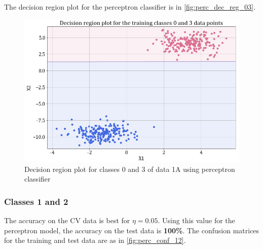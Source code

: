 \documentclass[11pt,a4paper]{article}
\begin{document}
The decision region plot for the perceptron classifier is in \autoref{fig:perc_dec_reg_03}.
\begin{figure}[H]
    \centering
    \includegraphics[scale=0.45]{images/1A_perceptron_training_classes_0_and_3_dec_reg.png}
    \caption{Decision region plot for classes 0 and 3 of data 1A using perceptron classifier}
    \label{fig:perc_dec_reg_03}
\end{figure}

\subsubsection{Classes 1 and 2}


The accuracy on the CV data is best for $\eta = 0.05$. Using this value for the perceptron model, the accuracy on the test data is \textbf{100\%}. The confusion matrices for the training and test data are as in \autoref{fig:perc_conf_12}.
\end{document}
